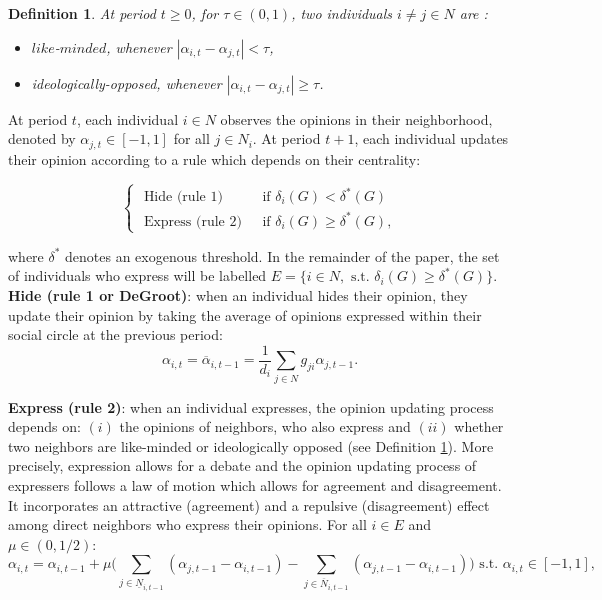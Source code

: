 \documentclass{article}
\newtheorem{definition}{Definition}
\begin{document}
\begin{definition} At period $t \geq 0$, for $\tau \in (0,1)$, two individuals $ i \neq j \in N$ are :  \begin{itemize} \item[(i)]  $like$-$minded$, whenever $|\alpha_{i,t} - \alpha_{j,t}| < \tau$, \item[(ii)] \textit{ideologically-opposed}, whenever $|\alpha_{i,t} - \alpha_{j,t}| \geq \tau$. \end{itemize} \label{definition_likeminded} 
\end{definition}

At period $t$, each individual $i \in N$ observes the opinions in their neighborhood, denoted by ${\alpha}_{j,t} \in [-1,1]$ for all $j \in N_i$. At period $t+1$, each individual updates their opinion according to a rule which depends on their centrality: 

\begin{equation*} 
	\begin{cases}
		 \text{ Hide (rule 1) } & \text{ if } \delta_i (G) < \delta^{*} (G) \\
		\text{ Express (rule 2) } & \text{ if } \delta_i (G) \geq \delta^{*} (G),
	\end{cases}
\end{equation*} 
\bigskip

\noindent where $\delta^{*}$ denotes an exogenous threshold. In the remainder of the paper, the set of individuals who express will be labelled $E=\{ i \in N, \text{ s.t. } \delta_i (G) \geq \delta^{*} (G) \}$. \\

{\noindent \bf Hide (rule 1 or DeGroot)}: when an individual hides their opinion, they update their opinion by taking the average of opinions expressed within their social circle at the previous period: 
\begin{equation} 
\alpha_{i,t} = \overline{\alpha}_{i,t-1} = \frac{1}{d_i}  \sum_{j  \in N} g_{ji} {\alpha}_{j,t-1}. \label{average}
\end{equation}
  
{\noindent \bf Express (rule 2)}: when an individual expresses, the opinion updating process depends on: $(i)$ the opinions of neighbors, who also express and $(ii)$ whether two neighbors are like-minded or ideologically opposed (see Definition \ref{definition_likeminded}). More precisely, expression allows for a debate and the opinion updating process of expressers follows a law of motion which allows for agreement and disagreement. It incorporates an attractive (agreement) and a repulsive (disagreement) effect among direct neighbors who express their opinions. For all $ i \in E$ and {\color{red}$\mu \in (0,1/2)$}: 
 \begin{equation}
 \alpha_{i,{t}} =  \alpha_{i,{t-1}} +  \mu \big( \sum_{j \in \underline{N}_{i,t-1}}   (  \alpha_{j,t-1} - \alpha_{i,t-1} ) - \sum_{j \in \overline{N}_{i,t-1}} ( \alpha_{j,t-1} - \alpha_{i,t-1} ) \big)  \text{ s.t. } \alpha_{i,t} \in [-1,1],
 \label{lawofmotion}
 \end{equation}
\end{document}

